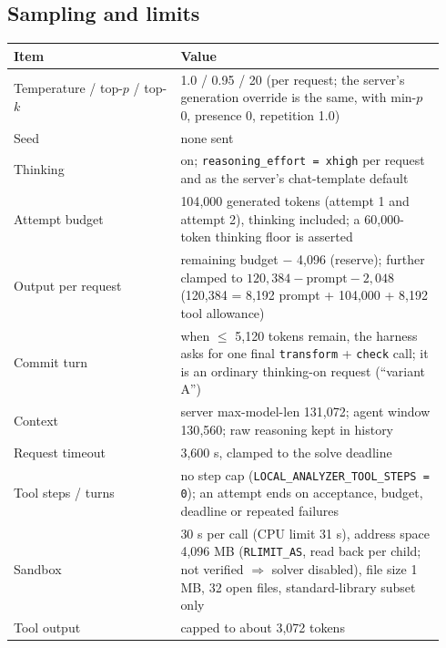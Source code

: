 \subsection{Sampling and limits}
\begin{center}\small
\begin{tabular}{@{}p{0.36\linewidth}p{0.58\linewidth}@{}}
\toprule
Item & Value \\
\midrule
Temperature / top-$p$ / top-$k$ & 1.0 / 0.95 / 20 (per request; the server's generation override is the same, with min-$p$ 0, presence 0, repetition 1.0) \\
Seed & none sent \\
Thinking & on; \texttt{reasoning\_effort = xhigh} per request and as the server's chat-template default \\
Attempt budget & 104{,}000 generated tokens (attempt 1 and attempt 2), thinking included; a 60{,}000-token thinking floor is asserted \\
Output per request & remaining budget $-$ 4{,}096 (reserve); further clamped to $120{,}384 - \text{prompt} - 2{,}048$ (120{,}384 = 8{,}192 prompt + 104{,}000 + 8{,}192 tool allowance) \\
Commit turn & when $\le$ 5{,}120 tokens remain, the harness asks for one final \texttt{transform} + \texttt{check} call; it is an ordinary thinking-on request (``variant A'') \\
Context & server max-model-len 131{,}072; agent window 130{,}560; raw reasoning kept in history \\
Request timeout & 3{,}600 s, clamped to the solve deadline \\
Tool steps / turns & no step cap (\texttt{LOCAL\_ANALYZER\_TOOL\_STEPS = 0}); an attempt ends on acceptance, budget, deadline or repeated failures \\
Sandbox & 30 s per call (CPU limit 31 s), address space 4{,}096 MB (\texttt{RLIMIT\_AS}, read back per child; not verified $\Rightarrow$ solver disabled), file size 1 MB, 32 open files, standard-library subset only \\
Tool output & capped to about 3{,}072 tokens \\
\bottomrule
\end{tabular}
\end{center}

